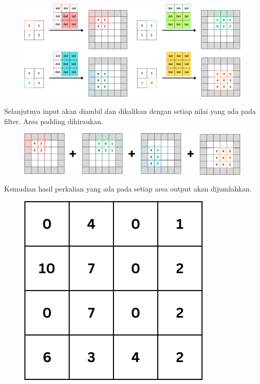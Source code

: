 \begin{figure}[H]
	\centering
	\includegraphics[scale=.2]{gambar/lampiran/dekonv-full.png}
\end{figure}

Selanjutnya input akan diambil dan dikalikan dengan setiap nilai yang ada pada filter. Area padding dihiraukan.

\begin{figure}[H]
	\centering
	\includegraphics[scale=.2]{gambar/lampiran/dekonv-7.png}
\end{figure}

Kemudian hasil perkalian yang ada pada setiap area output akan dijumlahkan.

\begin{figure}[H]
	\centering
	\includegraphics[scale=.3]{gambar/lampiran/dekonv-8.png}
\end{figure}

